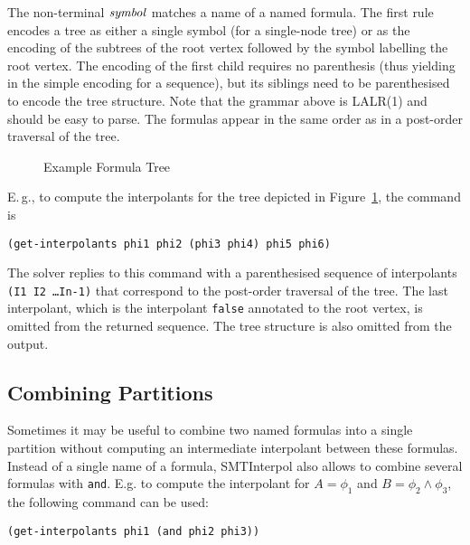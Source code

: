 \documentclass[a4paper,12pt]{article}
\begin{document}
The non-terminal $\mathop{\mathit{symbol}}$ matches a name of a named
formula.  The first rule encodes a tree as either a single symbol (for
a single-node tree) or as the encoding of the subtrees of the root
vertex followed by the symbol labelling the root vertex.  The encoding
of the first child requires no parenthesis (thus yielding in the
simple encoding for a sequence), but its siblings need to be
parenthesised to encode the tree structure.  Note that the grammar
above is LALR(1) and should be easy to parse.  The formulas appear in
the same order as in a post-order traversal of the tree.
%
\begin{figure}
  \begin{center}
  \end{center}
  \caption{\label{fig:treeipex}Example Formula Tree}
\end{figure}
%
E.\,g., to compute the interpolants for the tree depicted in
Figure~\ref{fig:treeipex}, the command is
\begin{verbatim}
(get-interpolants phi1 phi2 (phi3 phi4) phi5 phi6)
\end{verbatim}

The solver replies to this command with a parenthesised sequence of
interpolants \texttt{(I1 I2 \dots In-1)} that correspond to the
post-order traversal of the tree.  The last interpolant, which is the
interpolant \texttt{false} annotated to the root vertex, is omitted
from the returned sequence.  The tree structure is also omitted from
the output.

\subsection{Combining Partitions}

Sometimes it may be useful to combine two named formulas into a single
partition without computing an intermediate interpolant between these
formulas.  Instead of a single name of a formula, SMTInterpol also allows to combine several formulas with \texttt{and}.  E.g. to compute the interpolant for $A=\phi_1$ and $B=\phi_2 \land \phi_3$, the following command can be used:
\begin{verbatim}
(get-interpolants phi1 (and phi2 phi3))
\end{verbatim}
\end{document}
